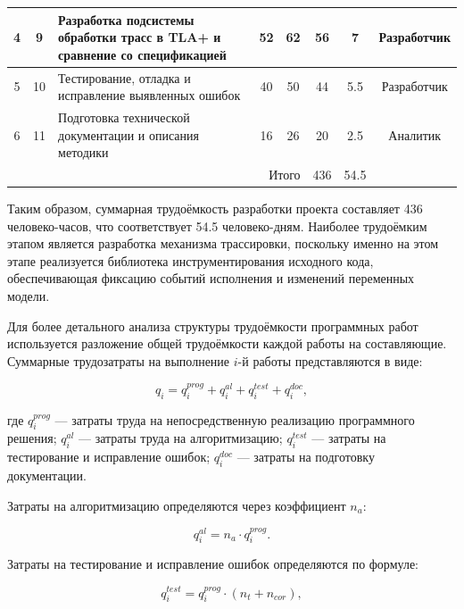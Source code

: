 \begin{table}[h]
{\begin{tabular}{|c|c|p{6.6cm}|c|c|c|c|c|}
4 & 9 &
Разработка подсистемы обработки трасс в TLA+ и сравнение со спецификацией &
52 & 62 & 56 & 7 & Разработчик \\ \hline

5 & 10 &
Тестирование, отладка и исправление выявленных ошибок &
40 & 50 & 44 & 5.5 & Разработчик \\ \hline

6 & 11 &
Подготовка технической документации и описания методики &
16 & 26 & 20 & 2.5 & Аналитик \\ \hline

\multicolumn{5}{|r|}{Итого} & 436 & 54.5 & \\ \hline

\end{tabular}
}
\end{table}

Таким образом, суммарная трудоёмкость разработки проекта составляет
436 человеко-часов, что соответствует 54.5 человеко-дням. Наиболее
трудоёмким этапом является разработка механизма трассировки, поскольку
именно на этом этапе реализуется библиотека инструментирования
исходного кода, обеспечивающая фиксацию событий исполнения и
изменений переменных модели.

Для более детального анализа структуры трудоёмкости программных работ
используется разложение общей трудоёмкости каждой работы на
составляющие. Суммарные трудозатраты на выполнение $i$-й работы
представляются в виде:

\begin{equation}
q_i = q_i^{prog} + q_i^{al} + q_i^{test} + q_i^{doc},
\end{equation}

где $q_i^{prog}$ --- затраты труда на непосредственную реализацию
программного решения; $q_i^{al}$ --- затраты труда на алгоритмизацию;
$q_i^{test}$ --- затраты на тестирование и исправление ошибок;
$q_i^{doc}$ --- затраты на подготовку документации.

Затраты на алгоритмизацию определяются через коэффициент $n_a$:

\begin{equation}
q_i^{al} = n_a \cdot q_i^{prog}.
\end{equation}

Затраты на тестирование и исправление ошибок определяются по формуле:

\begin{equation}
q_i^{test} = q_i^{prog} \cdot (n_t + n_{cor}),
\end{equation}

